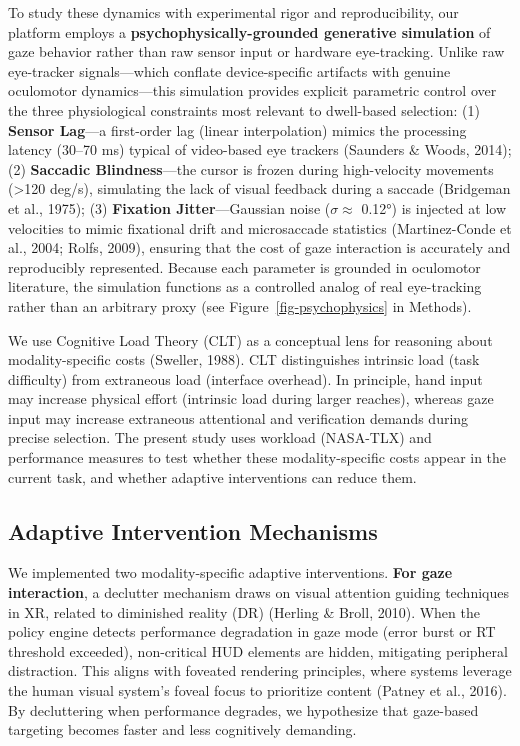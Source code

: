 \documentclass[
  11pt,
  11pt,
  letterpaper]{article}
\begin{document}
To study these dynamics with experimental rigor and reproducibility, our
platform employs a \textbf{psychophysically-grounded generative
simulation} of gaze behavior rather than raw sensor input or hardware
eye-tracking. Unlike raw eye-tracker signals---which conflate
device-specific artifacts with genuine oculomotor dynamics---this
simulation provides explicit parametric control over the three
physiological constraints most relevant to dwell-based selection: (1)
\textbf{Sensor Lag}---a first-order lag (linear interpolation) mimics
the processing latency (30--70 ms) typical of video-based eye trackers
(Saunders \& Woods, 2014); (2) \textbf{Saccadic Blindness}---the cursor
is frozen during high-velocity movements (\textgreater120 deg/s),
simulating the lack of visual feedback during a saccade (Bridgeman et
al., 1975); (3) \textbf{Fixation Jitter}---Gaussian noise
(\(\sigma \approx\) 0.12°) is injected at low velocities to mimic
fixational drift and microsaccade statistics (Martinez-Conde et al.,
2004; Rolfs, 2009), ensuring that the cost of gaze interaction is
accurately and reproducibly represented. Because each parameter is
grounded in oculomotor literature, the simulation functions as a
controlled analog of real eye-tracking rather than an arbitrary proxy
(see Figure~\ref{fig-psychophysics} in Methods).

We use Cognitive Load Theory (CLT) as a conceptual lens for reasoning
about modality-specific costs (Sweller, 1988). CLT distinguishes
intrinsic load (task difficulty) from extraneous load (interface
overhead). In principle, hand input may increase physical effort
(intrinsic load during larger reaches), whereas gaze input may increase
extraneous attentional and verification demands during precise
selection. The present study uses workload (NASA-TLX) and performance
measures to test whether these modality-specific costs appear in the
current task, and whether adaptive interventions can reduce them.

\subsection{Adaptive Intervention
Mechanisms}\label{adaptive-intervention-mechanisms}

We implemented two modality-specific adaptive interventions. \textbf{For
gaze interaction}, a declutter mechanism draws on visual attention
guiding techniques in XR, related to diminished reality (DR) (Herling \&
Broll, 2010). When the policy engine detects performance degradation in
gaze mode (error burst or RT threshold exceeded), non-critical HUD
elements are hidden, mitigating peripheral distraction. This aligns with
foveated rendering principles, where systems leverage the human visual
system's foveal focus to prioritize content (Patney et al., 2016). By
decluttering when performance degrades, we hypothesize that gaze-based
targeting becomes faster and less cognitively demanding.
\end{document}
